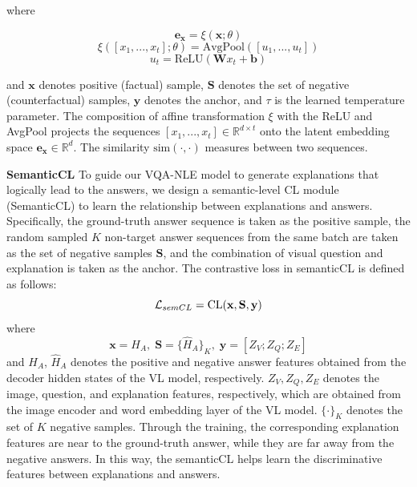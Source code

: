 \documentclass[letterpaper]{article} %
\begin{document}
where 

\begin{equation*} 
	\mathbf{e_x}=\xi\left(\mathbf{x};\theta \right)
\end{equation*} 
\begin{equation*} 
	\xi\left([x_1,...,x_t];\theta \right)=\text{AvgPool}([u_1,...,u_t])
\end{equation*} 
\begin{equation*} 
	u_t = \text{ReLU}(\mathbf{W}x_t+\mathbf{b})
\end{equation*} 

and $\mathbf{x}$ denotes positive (factual) sample, $\mathbf{S}$ denotes the set of negative (counterfactual) samples,  $\mathbf{y}$ denotes the anchor, and $\tau$ is the learned temperature parameter. The composition of affine transformation $\xi$ with the ReLU and AvgPool projects the sequences $[x_1,...,x_t]\in\mathbb{R}^{d \times t}$ onto the latent embedding space $\mathbf{e_x} \in \mathbb{R}^d$. The similarity $\text{sim}(\cdot,\cdot)$ measures between two sequences.

\noindent
\textbf{SemanticCL} To guide our VQA-NLE model to generate explanations that logically lead to the answers, we design a semantic-level CL module (SemanticCL) to learn the relationship between explanations and answers. Specifically, the ground-truth answer sequence is taken as the positive sample, the random sampled $K$ non-target answer sequences from the same batch are taken as the set of negative samples $\mathbf{S}$, and the combination of visual question and explanation is taken as the anchor. The contrastive loss in semanticCL is defined as follows:
\begin{equation}	
	\mathcal{L}_{semCL} = \text{CL}(\mathbf{x},\mathbf{S},\mathbf{y})\\
\end{equation}
where 
\begin{equation*}	
	\mathbf{x}={H_A}, \; \mathbf{S}=\{{\hat{H}_A}\}_{K}, \; \mathbf{y}={[Z_V;Z_Q;Z_E]}
\end{equation*}
and ${H_A}$, ${\hat{H}_A}$ denotes the positive and negative answer features obtained from the decoder hidden states of the VL model, respectively. ${Z_V,Z_Q,Z_E}$ denotes the image, question, and explanation features, respectively, which are obtained from the image encoder and word embedding layer of the VL model. $\{\cdot\}_K$ denotes the set of $K$ negative samples. Through the training, the corresponding explanation features are near to the ground-truth answer, while they are far away from the negative answers. In this way, the semanticCL helps learn the discriminative features between explanations and answers.
\end{document}
